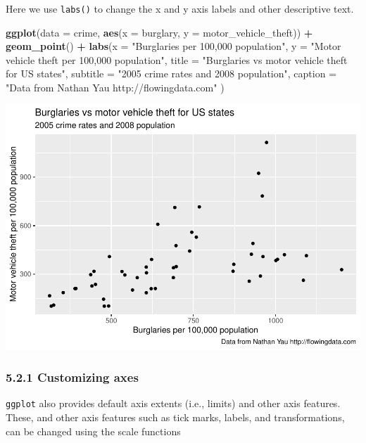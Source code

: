 \documentclass[]{article}
\newenvironment{Shaded}{\begin{snugshade}}{\end{snugshade}}
\newcommand{\KeywordTok}[1]{\textcolor[rgb]{0.13,0.29,0.53}{\textbf{#1}}}
\newcommand{\DataTypeTok}[1]{\textcolor[rgb]{0.13,0.29,0.53}{#1}}
\newcommand{\StringTok}[1]{\textcolor[rgb]{0.31,0.60,0.02}{#1}}
\newcommand{\OperatorTok}[1]{\textcolor[rgb]{0.81,0.36,0.00}{\textbf{#1}}}
\newcommand{\NormalTok}[1]{#1}
\begin{document}
Here we use \texttt{labs()} to change the x and y axis labels and other
descriptive text.

\begin{Shaded}
\begin{Highlighting}[]
\KeywordTok{ggplot}\NormalTok{(}\DataTypeTok{data =}\NormalTok{ crime, }\KeywordTok{aes}\NormalTok{(}\DataTypeTok{x =}\NormalTok{ burglary, }\DataTypeTok{y =}\NormalTok{ motor_vehicle_theft)) }\OperatorTok{+}
\StringTok{  }\KeywordTok{geom_point}\NormalTok{() }\OperatorTok{+}
\StringTok{  }\KeywordTok{labs}\NormalTok{(}\DataTypeTok{x =} \StringTok{"Burglaries per 100,000 population"}\NormalTok{,}
       \DataTypeTok{y =} \StringTok{"Motor vehicle theft per 100,000 population"}\NormalTok{,}
       \DataTypeTok{title =} \StringTok{"Burglaries vs motor vehicle theft for US states"}\NormalTok{,}
       \DataTypeTok{subtitle =} \StringTok{"2005 crime rates and 2008 population"}\NormalTok{,}
       \DataTypeTok{caption =} \StringTok{"Data from Nathan Yau http://flowingdata.com"}
\NormalTok{)}
\end{Highlighting}
\end{Shaded}

\includegraphics{stt-301-programming_files/figure-latex/unnamed-chunk-63-1.pdf}

\subsubsection{5.2.1 Customizing axes}\label{customizing-axes}

\texttt{ggplot} also provides default axis extents (i.e., limits) and
other axis features. These, and other axis features such as tick marks,
labels, and transformations, can be changed using the scale functions
\end{document}
